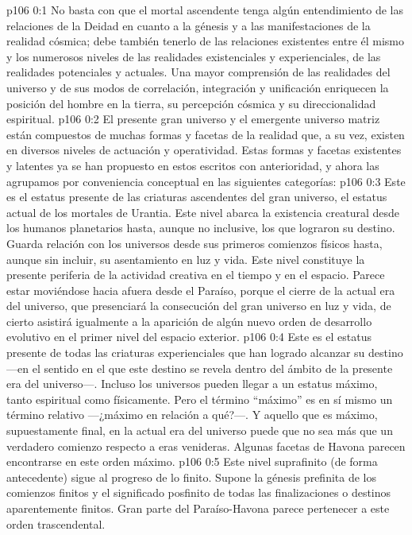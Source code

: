 \author{Melquisedec}
\vs p106 0:1 No basta con que el mortal ascendente tenga algún entendimiento de las relaciones de la Deidad en cuanto a la génesis y a las manifestaciones de la realidad cósmica; debe también tenerlo de las relaciones existentes entre él mismo y los numerosos niveles de las realidades existenciales y experienciales, de las realidades potenciales y actuales. Una mayor comprensión de las realidades del universo y de sus modos de correlación, integración y unificación enriquecen la posición del hombre en la tierra, su percepción cósmica y su direccionalidad espiritual.
\vs p106 0:2 El presente gran universo y el emergente universo matriz están compuestos de muchas formas y facetas de la realidad que, a su vez, existen en diversos niveles de actuación y operatividad. Estas formas y facetas existentes y latentes ya se han propuesto en estos escritos con anterioridad, y ahora las agrupamos por conveniencia conceptual en las siguientes categorías:
\vs p106 0:3  Este es el estatus presente de las criaturas ascendentes del gran universo, el estatus actual de los mortales de Urantia. Este nivel abarca la existencia creatural desde los humanos planetarios hasta, aunque no inclusive, los que lograron su destino. Guarda relación con los universos desde sus primeros comienzos físicos hasta, aunque sin incluir, su asentamiento en luz y vida. Este nivel constituye la presente periferia de la actividad creativa en el tiempo y en el espacio. Parece estar moviéndose hacia afuera desde el Paraíso, porque el cierre de la actual era del universo, que presenciará la consecución del gran universo en luz y vida, de cierto asistirá igualmente a la aparición de algún nuevo orden de desarrollo evolutivo en el primer nivel del espacio exterior.
\vs p106 0:4  Este es el estatus presente de todas las criaturas experienciales que han logrado alcanzar su destino ---en el sentido en el que este destino se revela dentro del ámbito de la presente era del universo---. Incluso los universos pueden llegar a un estatus máximo, tanto espiritual como físicamente. Pero el término “máximo” es en sí mismo un término relativo ---¿máximo en relación a qué?---. Y aquello que es máximo, supuestamente final, en la actual era del universo puede que no sea más que un verdadero comienzo respecto a eras venideras. Algunas facetas de Havona parecen encontrarse en este orden máximo.
\vs p106 0:5  Este nivel suprafinito (de forma antecedente) sigue al progreso de lo finito. Supone la génesis prefinita de los comienzos finitos y el significado posfinito de todas las finalizaciones o destinos aparentemente finitos. Gran parte del Paraíso\hyp{}Havona parece pertenecer a este orden trascendental.
